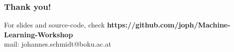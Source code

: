 \documentclass[color=usenames,dvipsnames]{beamer}
\begin{document}
{
	
	
	\begin{frame}
	\frametitle{Thank you!}
	\begin{block}{
			For slides and source-code, check \textbf{https://github.com/joph/Machine-Learning-Workshop}\\
			mail: johannes.schmidt@boku.ac.at\\
			
		}
	\end{block}
	
	\vspace{2.5 cm}
	
	
\end{frame}

}
\end{document}

